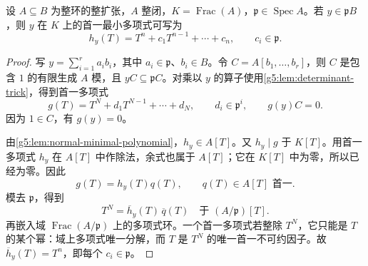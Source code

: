 \begin{lemma}
\label{g5:lem:integral-prime-coefficients}
	设 \(A\subseteq B\) 为整环的整扩张，\(A\) 整闭，\(K=\operatorname{Frac}(A)\)，\(\mathfrak p\in\operatorname{Spec}A\)。若 \(y\in\mathfrak pB\)，则 \(y\) 在 \(K\) 上的首一最小多项式可写为
	\[
		h_y(T)=T^n+c_1T^{n-1}+\cdots+c_n,
		\qquad c_i\in\mathfrak p.
	\]
\end{lemma}
\begin{proof}
	写 \(y=\sum_{i=1}^r a_i b_i\)，其中 \(a_i\in\mathfrak p\)、\(b_i\in B\)。令 \(C=A[b_1,\ldots,b_r]\)，则 \(C\) 是包含 \(1\) 的有限生成 \(A\) 模，且 \(yC\subseteq\mathfrak pC\)。对乘以 \(y\) 的算子使用\cref{g5:lem:determinant-trick}，得到首一多项式
	\[
		g(T)=T^N+d_1T^{N-1}+\cdots+d_N,
		\qquad d_i\in\mathfrak p^i,
		\qquad g(y)C=0.
	\]
	因为 \(1\in C\)，有 \(g(y)=0\)。

	由\cref{g5:lem:normal-minimal-polynomial}，\(h_y\in A[T]\)。又 \(h_y\mid g\) 于 \(K[T]\)。用首一多项式 \(h_y\) 在 \(A[T]\) 中作除法，余式也属于 \(A[T]\)；它在 \(K[T]\) 中为零，所以已经为零。因此
	\[
		g(T)=h_y(T)q(T),\qquad q(T)\in A[T]\text{ 首一}.
	\]
	模去 \(\mathfrak p\)，得到
	\[
		T^N=\overline h_y(T)\,\overline q(T)
		\quad\text{于 }(A/\mathfrak p)[T].
	\]
	再嵌入域 \(\operatorname{Frac}(A/\mathfrak p)\) 上的多项式环。一个首一多项式若整除 \(T^N\)，它只能是 \(T\) 的某个幂：域上多项式唯一分解，而 \(T\) 是 \(T^N\) 的唯一首一不可约因子。故 \(\overline h_y(T)=T^n\)，即每个 \(c_i\in\mathfrak p\)。
\end{proof}

